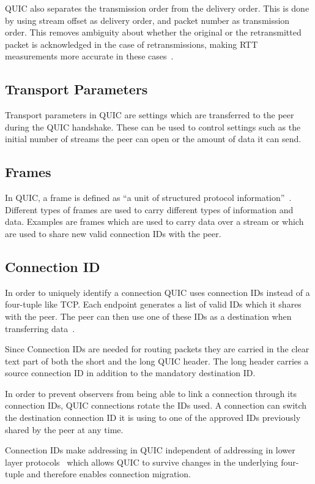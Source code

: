 QUIC also separates the transmission order from the delivery order.
This is done by using stream offset as delivery order, and packet number as
transmission order. This removes ambiguity about whether the
original or the retransmitted packet is acknowledged in the case
of retransmissions, making RTT measurements more accurate in these cases~\cite[sec.~4.2]{rfc9002}.

\subsection{Transport Parameters}
Transport parameters in QUIC are settings which are transferred to the
peer during the QUIC handshake.
These can be used to control settings such as the initial number of streams
the peer can open or the amount of data it can send.

\subsection{Frames}
In QUIC, a frame is defined as \enquote{a unit of structured protocol information}~\cite{rfc9000}.
Different types of frames are used to carry different types of information
and data. Examples are  frames which are used to carry
data over a stream or  which are used
to share new valid connection IDs with the peer.

\subsection{Connection ID}\label{sec:quic-conn-id}
In order to uniquely identify a connection QUIC uses connection IDs
instead of a four-tuple like TCP. Each endpoint generates a list of
valid IDs which it shares with the peer. The peer can then use one
of these IDs as a destination when transferring data~\cite[sec.~5.1]{rfc9000}.

Since Connection IDs are needed for routing packets they are
carried in the clear text part of both the short and the long QUIC header.
The long header carries a source connection ID in addition to the mandatory
destination ID.

In order to prevent observers from being able to link a connection
through its connection IDs, QUIC connections rotate the IDs used.
A connection can switch the destination connection ID it is using
to one of the approved IDs previously shared by the peer at any time.

Connection IDs make addressing in QUIC independent of addressing in lower layer
protocols~\cite{rfc9000} which allows QUIC to survive
changes in the underlying four-tuple and therefore enables
connection migration.

